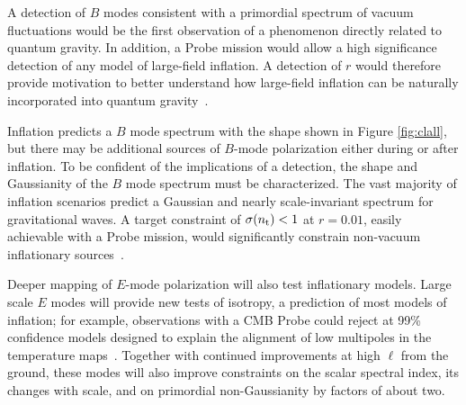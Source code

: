 A detection of $B$ modes consistent with a primordial spectrum of vacuum fluctuations would be the first observation of a phenomenon directly related to quantum gravity. In addition, a Probe mission would allow a high significance detection of any model of large-field inflation.
A detection of $r$ would therefore provide 
motivation to better understand how large-field inflation can be naturally incorporated into quantum gravity~\cite{Banks:2003sx,Baumann:2014nda,Brown:2015iha,Rudelius:2015xta,Silverstein:2008sg,Kaloper:2008fb,Marchesano:2014mla,Blumenhagen:2015xpa}. 

Inflation predicts a $B$ mode spectrum with the shape shown in Figure \ref{fig:clall}, but there may be additional sources of $B$-mode polarization either during or after 
inflation. To be confident of the implications of a detection, the shape and Gaussianity of the $B$ mode spectrum 
must be characterized. The vast majority of inflation scenarios predict a Gaussian and nearly scale-invariant spectrum for 
gravitational waves. A target constraint of $\sigma(n_{\rm t})<1$ at $r=0.01$, easily achievable with a Probe mission, would significantly constrain non-vacuum 
inflationary sources~\cite{Namba:2015gja,Peloso:2016gqs}.

Deeper mapping of $E$-mode polarization will also test inflationary models. Large scale $E$ modes will provide new tests of isotropy, a prediction of most models of inflation; 
for example, observations with a CMB Probe could reject at 99\% confidence models designed to explain the alignment of low multipoles in the temperature maps~\cite{Dvorkin:2007jp}. 
Together with continued improvements at high $\ell$ from the ground, these modes will also improve constraints on the scalar 
spectral index, its changes with scale, and on primordial non-Gaussianity by factors of about two. 

